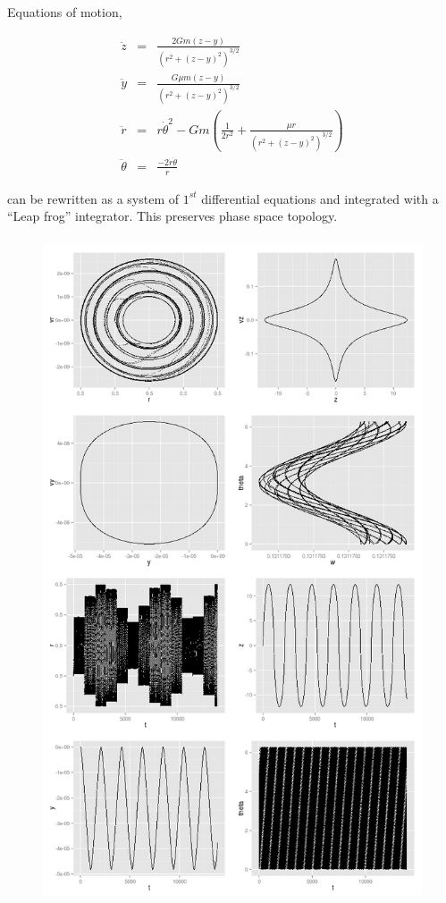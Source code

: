 \documentclass{article}
\begin{document}
Equations of motion,

\begin{eqnarray}
\ddot{z} & = & \frac{2G m (z-y)}{(r^2 + (z-y)^2)^{3/2}} \\
\ddot{y} & = & \frac{G \mu m (z-y)}{(r^2 + (z-y)^2)^{3/2}} \\
\ddot{r} & = & r\dot{\theta}^2 - Gm (\frac{1}{2r^2} + \frac{\mu r}{(r^2 + (z-y)^2)^{3/2}}) \\
\ddot{\theta} & = & \frac{-2 \dot{r} \dot{\theta}}{r} 
\label{eq:mot}
\end{eqnarray}

\noindent can be rewritten as a system of $1^{st}$ differential equations and integrated with a ``Leap frog'' integrator. This
preserves phase space topology.

\begin{figure}[h]
    \begin{center}
        \includegraphics[height=7.75in]{./img/example.png}
    \end{center}
\label{fig:example}
\end{figure}
\end{document}
